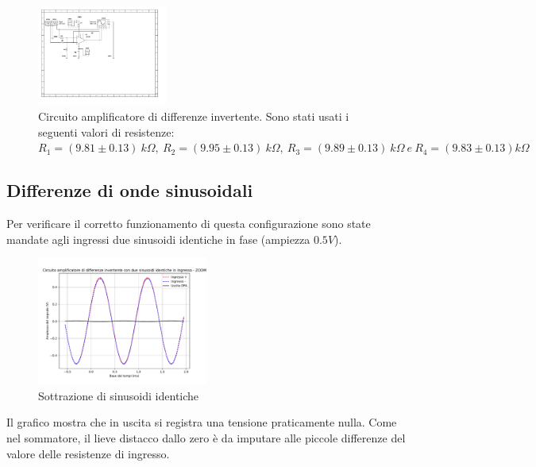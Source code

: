 \documentclass[journal]{IEEEtran}
\begin{document}
\begin{figure}[H]%
\begin {center}
\includegraphics[width=0.38\textwidth]{sch-simulations/output/OPA-difference-amp.pdf}
\caption{Circuito amplificatore di differenze invertente. Sono stati usati i seguenti valori di resistenze: $R_1 =(9.81 \pm 0.13) \ k\Omega, \ R_2 = (9.95 \pm 0.13) \ k\Omega ,\ R_3 = (9.89 \pm 0.13) \ k\Omega \ e \ R_4 = (9.83 \pm 0.13) k\Omega  $  }
\label{fig:differenze}
\end {center}
\end{figure}

\subsection{\textbf{Differenze di onde sinusoidali}}
Per verificare il corretto funzionamento di questa configurazione sono state mandate agli ingressi due sinusoidi identiche in fase (ampiezza $0.5 V$). 

\begin{figure}[H]%
\begin {center}
\includegraphics[width=0.50\textwidth]{analysis/output/OPA_diff_sin2.pdf}
\caption{Sottrazione di sinusoidi identiche}
\label{fig:diff2}
\end {center}
\end{figure}

Il grafico mostra che in uscita si registra una tensione praticamente nulla. Come nel sommatore, il lieve distacco dallo zero è da imputare alle piccole differenze del valore delle resistenze di ingresso.
\end{document}
